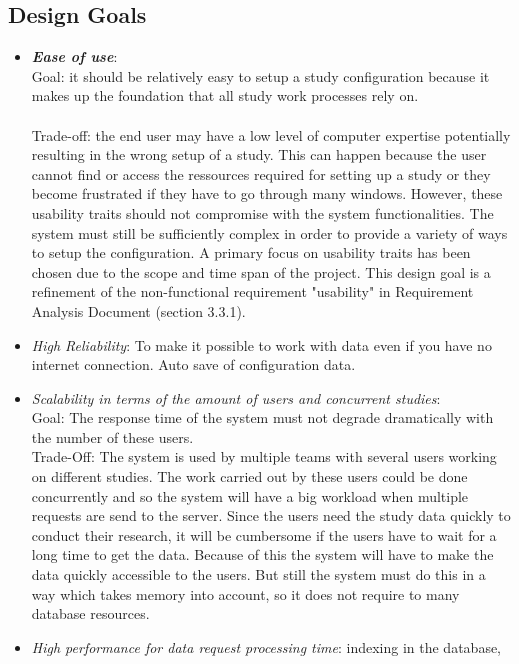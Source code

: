 \subsection{Design Goals}

\begin{itemize}
\item \textit{\bf{Ease of use}}: 
\\
Goal: it should be relatively easy to setup a study configuration because it makes up the foundation that all study work processes rely on. 
\\\\
Trade-off: the end user may have a low level of computer expertise potentially resulting in the wrong setup of a study.  This can happen because the user cannot find or access the ressources required for setting up a study or they become frustrated if they have to go through many windows. However, these usability traits should not compromise with the system functionalities. The system must still be sufficiently complex in order to provide a variety of ways to setup the configuration.  A primary focus on usability traits has been chosen due to the scope and time span of the project. This design goal is a refinement of the non-functional requirement  "usability" in Requirement Analysis Document  (section 3.3.1). 

\item \textit{High Reliability}: To make it possible to work with data even if you have no internet connection. Auto save of configuration data.

\item \textit{Scalability in terms of the amount of users and concurrent studies}:\\
Goal: The response time of the system must not degrade dramatically with the number of these users.\\
Trade-Off: The system is used by multiple teams with several users working on different studies. The work carried out by these users could be done concurrently and so the system will have a big workload when multiple requests are send to the server. Since the users need the study data quickly to conduct their research, it will be cumbersome if the users have to wait for a long time to get the data. Because of this the system will have to make the data quickly accessible to the users. But still the system must do this in a way which takes memory into account, so it does not require to many database resources.

\item \textit{High performance for data request processing time}: indexing in the database, 
\end{itemize}
